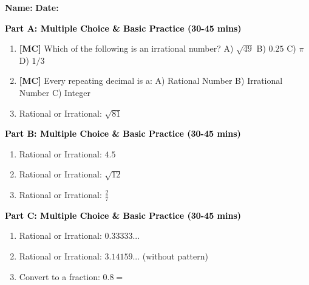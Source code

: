 \documentclass[12pt, letterpaper, fleqn]{article}
\newcommand{\blank}{\underline{\hspace{2.2cm}}}
\begin{document}
\textbf{Name:} \underline{\hspace{5cm}}
\hfill
\textbf{Date:} \underline{\hspace{3cm}}\\


\begin{tcolorbox}[colback=customteal!20]
\large\textcolor{black}{\textbf{Part A: Multiple Choice \& Basic Practice (30-45 mins)}}
\end{tcolorbox}

\vspace{3mm}

\begin{enumerate}[itemsep=2.5cm, leftmargin=0.6cm]
\item \textbf{[MC]} Which of the following is an irrational number?
A) $\sqrt{49}$ B) $0.25$ C) $\pi$ D) $1/3$
\item \textbf{[MC]} Every repeating decimal is a:
A) Rational Number B) Irrational Number C) Integer
\item Rational or Irrational: $\sqrt{81}$ \blank
\end{enumerate}

\newpage

\begin{tcolorbox}[colback=customteal!20]
\large\textcolor{black}{\textbf{Part B: Multiple Choice \& Basic Practice (30-45 mins)}}
\end{tcolorbox}

\vspace{3mm}

\begin{enumerate}[itemsep=2.5cm, leftmargin=0.6cm, resume]
\item Rational or Irrational: $4.5$ \blank
\item Rational or Irrational: $\sqrt{12}$ \blank
\item Rational or Irrational: $\frac{2}{7}$ \blank
\end{enumerate}

\newpage

\begin{tcolorbox}[colback=customteal!20]
\large\textcolor{black}{\textbf{Part C: Multiple Choice \& Basic Practice (30-45 mins)}}
\end{tcolorbox}

\vspace{3mm}

\begin{enumerate}[itemsep=2.5cm, leftmargin=0.6cm, resume]
\item Rational or Irrational: $0.33333...$ \blank
\item Rational or Irrational: $3.14159...$ (without pattern) \blank
\item Convert to a fraction: $0.8 = $ \blank
\end{enumerate}
\end{document}
